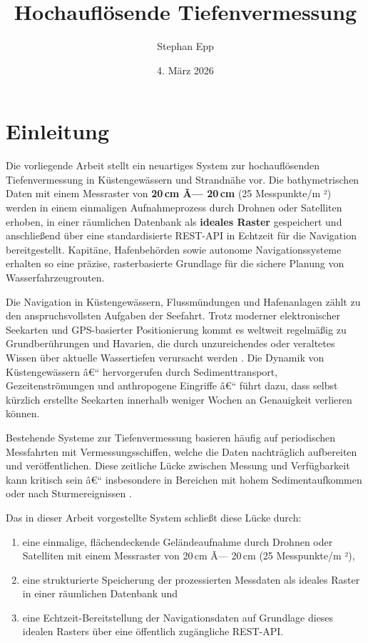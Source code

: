 ﻿\documentclass[a4paper,12pt]{article}
\title{Hochauflösende Tiefenvermessung}
\author{Stephan Epp}
\date{4. März 2026}
\theoremstyle{definition}
\begin{document}

\maketitle

\tableofcontents
\newpage

\section{Einleitung}
Die vorliegende Arbeit stellt ein neuartiges System zur hochauflösenden Tiefenvermessung
in Küstengewässern und Strandnähe vor. Die bathymetrischen Daten mit einem Messraster
von \textbf{20\,cm Ã— 20\,cm} (25 Messpunkte/m ²) werden in einem einmaligen Aufnahmeprozess
durch Drohnen oder Satelliten erhoben, in einer räumlichen Datenbank als \textbf{ideales Raster}
gespeichert und anschließend über eine standardisierte REST-API in Echtzeit für die Navigation
bereitgestellt. Kapitäne, Hafenbehörden sowie autonome Navigationssysteme erhalten so eine
präzise, rasterbasierte Grundlage für die sichere Planung von Wasserfahrzeugrouten.

Die Navigation in Küstengewässern, Flussmündungen und Hafenanlagen zählt zu den
anspruchsvollsten Aufgaben der Seefahrt. Trotz moderner elektronischer Seekarten und
GPS-basierter Positionierung kommt es weltweit regelmäßig zu Grundberührungen und
Havarien, die durch unzureichendes oder veraltetes Wissen über aktuelle Wassertiefen
verursacht werden \cite{iho2020, imocircular}. Die Dynamik von Küstengewässern â€“
hervorgerufen durch Sedimenttransport, Gezeitenströmungen und anthropogene Eingriffe â€“
führt dazu, dass selbst kürzlich erstellte Seekarten innerhalb weniger Wochen an Genauigkeit
verlieren können.

\medskip\noindent
Bestehende Systeme zur Tiefenvermessung basieren häufig auf periodischen Messfahrten
mit Vermessungsschiffen, welche die Daten nachträglich aufbereiten und veröffentlichen.
Diese zeitliche Lücke zwischen Messung und Verfügbarkeit kann kritisch sein â€“ insbesondere
in Bereichen mit hohem Sedimentaufkommen oder nach Sturmereignissen
\cite{minkoff2019, guenther2000}.

\medskip\noindent
Das in dieser Arbeit vorgestellte System schließt diese Lücke durch:

\begin{enumerate}[label=\alph*)]
  \item eine einmalige, flächendeckende Geländeaufnahme durch Drohnen oder Satelliten
        mit einem Messraster von 20\,cm Ã— 20\,cm (25 Messpunkte/m ²),
  \item eine strukturierte Speicherung der prozessierten Messdaten als ideales Raster
        in einer räumlichen Datenbank und
  \item eine Echtzeit-Bereitstellung der Navigationsdaten auf Grundlage dieses idealen
        Rasters über eine öffentlich zugängliche REST-API.
\end{enumerate}
\end{document}
